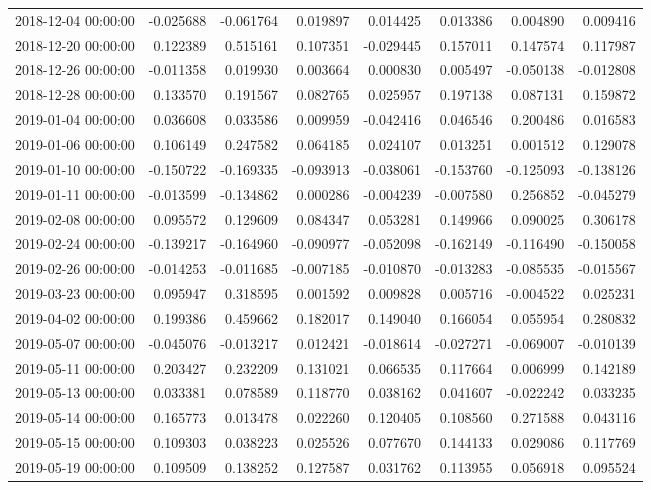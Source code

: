 \begin{tabular}{lrrrrrrr}
2018-12-04 00:00:00 & -0.025688 & -0.061764 & 0.019897 & 0.014425 & 0.013386 & 0.004890 & 0.009416 \\
2018-12-20 00:00:00 & 0.122389 & 0.515161 & 0.107351 & -0.029445 & 0.157011 & 0.147574 & 0.117987 \\
2018-12-26 00:00:00 & -0.011358 & 0.019930 & 0.003664 & 0.000830 & 0.005497 & -0.050138 & -0.012808 \\
2018-12-28 00:00:00 & 0.133570 & 0.191567 & 0.082765 & 0.025957 & 0.197138 & 0.087131 & 0.159872 \\
2019-01-04 00:00:00 & 0.036608 & 0.033586 & 0.009959 & -0.042416 & 0.046546 & 0.200486 & 0.016583 \\
2019-01-06 00:00:00 & 0.106149 & 0.247582 & 0.064185 & 0.024107 & 0.013251 & 0.001512 & 0.129078 \\
2019-01-10 00:00:00 & -0.150722 & -0.169335 & -0.093913 & -0.038061 & -0.153760 & -0.125093 & -0.138126 \\
2019-01-11 00:00:00 & -0.013599 & -0.134862 & 0.000286 & -0.004239 & -0.007580 & 0.256852 & -0.045279 \\
2019-02-08 00:00:00 & 0.095572 & 0.129609 & 0.084347 & 0.053281 & 0.149966 & 0.090025 & 0.306178 \\
2019-02-24 00:00:00 & -0.139217 & -0.164960 & -0.090977 & -0.052098 & -0.162149 & -0.116490 & -0.150058 \\
2019-02-26 00:00:00 & -0.014253 & -0.011685 & -0.007185 & -0.010870 & -0.013283 & -0.085535 & -0.015567 \\
2019-03-23 00:00:00 & 0.095947 & 0.318595 & 0.001592 & 0.009828 & 0.005716 & -0.004522 & 0.025231 \\
2019-04-02 00:00:00 & 0.199386 & 0.459662 & 0.182017 & 0.149040 & 0.166054 & 0.055954 & 0.280832 \\
2019-05-07 00:00:00 & -0.045076 & -0.013217 & 0.012421 & -0.018614 & -0.027271 & -0.069007 & -0.010139 \\
2019-05-11 00:00:00 & 0.203427 & 0.232209 & 0.131021 & 0.066535 & 0.117664 & 0.006999 & 0.142189 \\
2019-05-13 00:00:00 & 0.033381 & 0.078589 & 0.118770 & 0.038162 & 0.041607 & -0.022242 & 0.033235 \\
2019-05-14 00:00:00 & 0.165773 & 0.013478 & 0.022260 & 0.120405 & 0.108560 & 0.271588 & 0.043116 \\
2019-05-15 00:00:00 & 0.109303 & 0.038223 & 0.025526 & 0.077670 & 0.144133 & 0.029086 & 0.117769 \\
2019-05-19 00:00:00 & 0.109509 & 0.138252 & 0.127587 & 0.031762 & 0.113955 & 0.056918 & 0.095524 \\

\end{tabular}

